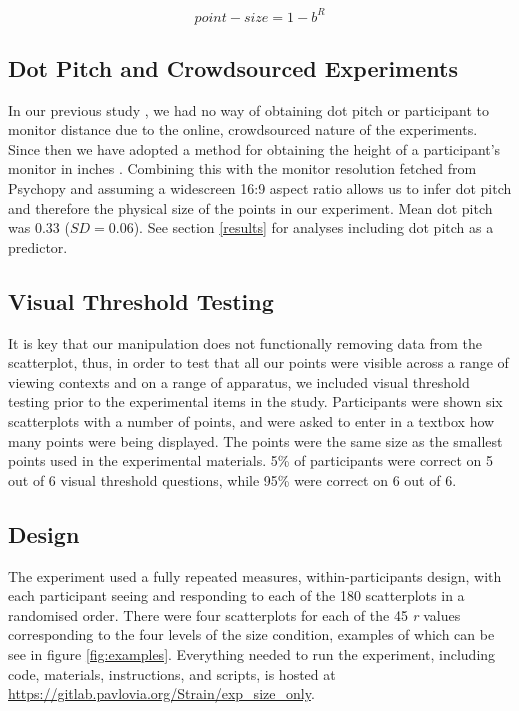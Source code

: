 \documentclass{vgtc}                          %
\begin{document}
\begin{equation}
  point-size = 1 - b^R
\end{equation}

\hypertarget{dot-pitch-and-crowdsourced-experiments-1}{%
\subsection{Dot Pitch and Crowdsourced Experiments}\label{dot-pitch-and-crowdsourced-experiments-1}}

In our previous study \cite{strain_2023}, we had no way of obtaining dot pitch
or participant to monitor distance due to the online, crowdsourced nature of the
experiments. Since then we have adopted a method for obtaining the height of a
participant's monitor in inches \cite{screenscale}. Combining this with the
monitor resolution fetched from Psychopy and assuming a widescreen 16:9 aspect ratio
allows us to infer dot pitch and therefore the physical size of the points in our
experiment. Mean dot pitch was 0.33 (\(SD = 0.06\)).
See section \ref{results} for analyses including dot pitch as a predictor.

\hypertarget{visual-threshold-testing}{%
\subsection{Visual Threshold Testing}\label{visual-threshold-testing}}

It is key that our manipulation does not functionally removing data from the scatterplot,
thus, in order to test that all our points were visible across a range of viewing
contexts and on a range of apparatus, we included visual threshold testing prior
to the experimental items in the study. Participants were shown six scatterplots
with a number of points, and were asked to enter in a textbox how many points
were being displayed. The points were the same size as the smallest points used
in the experimental materials. 5\% of
participants were correct on 5 out of 6 visual
threshold questions, while 95\% were correct
on 6 out of 6.

\hypertarget{design}{%
\subsection{Design}\label{design}}

The experiment used a fully repeated measures, within-participants design, with each
participant seeing and responding to each of the 180 scatterplots in a randomised order.
There were four scatterplots for each of the 45 \emph{r} values corresponding to the
four levels of the size condition, examples of which can be see in figure \ref{fig:examples}.
Everything needed to run the experiment, including code, materials, instructions, and scripts, is
hosted at \url{https://gitlab.pavlovia.org/Strain/exp_size_only}.
\end{document}
